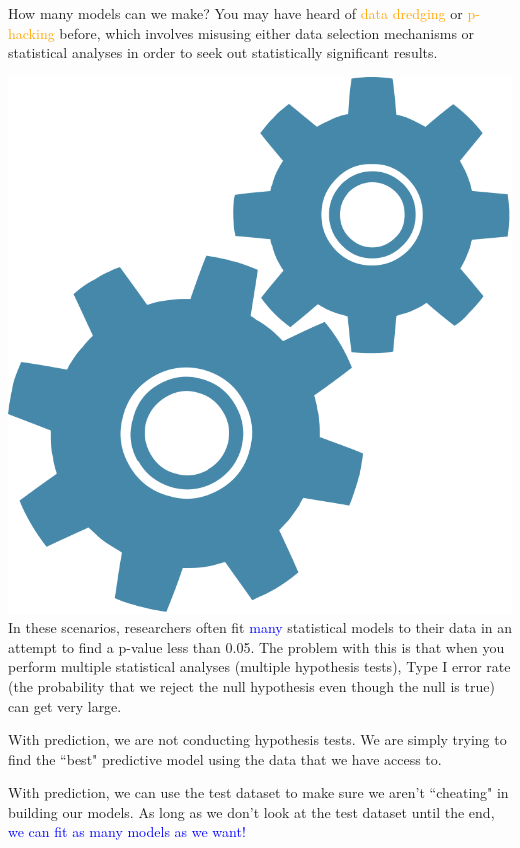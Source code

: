 \documentclass[10pt,t]{beamer}
\begin{document}
\begin{frame}{How many models can we make?}
	\vspace{-0.5cm}
	You may have heard of \textcolor{orange}{data dredging} or \textcolor{orange}{p-hacking} before, which involves misusing either data selection mechanisms or statistical analyses in order to seek out statistically significant results.
	
	\vspace{0.3cm}
	
	\includegraphics[scale=0.01]{figures/technical.png} In these scenarios, researchers often fit  \textcolor{blue}{many} statistical models to their data in an attempt to find a p-value less than 0.05. The problem with this is that when you perform multiple statistical analyses (multiple hypothesis tests), Type I error rate (the probability that we reject the null hypothesis even though the null is true) can get very large. 
	
	\vspace{0.3cm}
	
	With prediction, we are not conducting hypothesis tests. We are simply trying to find the ``best" predictive model using the data that we have access to. 
	
	\vspace{0.3cm}
	
	With prediction, we can use the test dataset to make sure we aren't ``cheating" in building our models. As long as we don't look at the test dataset until the end, \textcolor{blue}{we can fit as many models as we want!}
	
\end{frame}
\end{document}
